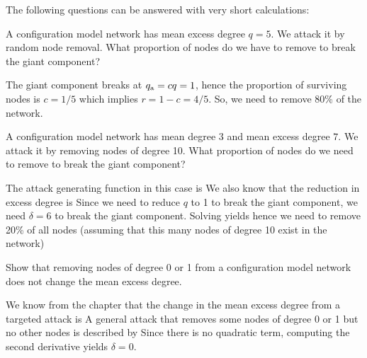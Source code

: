 
The following questions can be answered with very short calculations:

\subquestion 
A configuration model network has mean excess degree $q=5$. We attack it by random node removal. What proportion of nodes do we have to remove to break the giant component?

\solution
The giant component breaks at $q_{\rm a}=cq=1$, hence the proportion of surviving nodes is $c=1/5$ which implies $r=1-c=4/5$. So, we need to remove 80\% of the network.   

\subquestion 
A configuration model network has mean degree $3$ and mean excess degree $7$. We attack it by removing nodes of degree 10.  What proportion of nodes do we need to remove to break the giant component?

\solution 
The attack generating function in this case is 
We also know that the reduction in excess degree is 
Since we need to reduce $q$ to 1 to break the giant component, we need $\delta=6$ to break the giant component. Solving 
yields 
hence we need to remove 20\% of all nodes (assuming that this many nodes of degree 10 exist in the network)

\subquestion
Show that removing nodes of degree 0 or 1 from a configuration model network does not change the mean excess degree. 

\solution
We know from the chapter that the change in the mean excess degree from a targeted attack is 
A general attack that removes some nodes of degree 0 or 1 but no other nodes is described by 
Since there is no quadratic term, computing the second derivative yields  $\delta=0$. 
